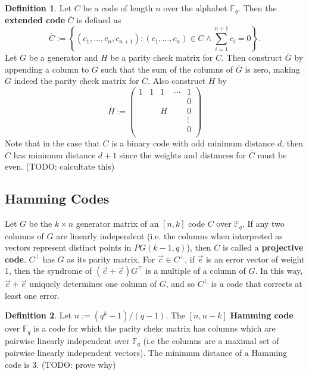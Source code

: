 \documentclass{article}
\newcommand{\F}{\mathbb{F}}
\newcommand{\dual}[1]{#1^\bot}
\newcommand{\trans}[1]{#1^\top}
\newcommand{\ext}[1]{\overline{#1}}
\renewcommand{\=}{\equiv}
\newcommand{\set}[1]{\left\{ #1 \right\}}
\renewcommand{\v}{\vec}
\theoremstyle{plain}
\theoremstyle{definition}
\newtheorem{defn}{Definition}[subsection]
\newcommand{\TODO}[1]{(TODO: #1)}
\begin{document}
\begin{defn}
Let $C$ be a code of length $n$ over the alphabet $\F_q$.
Then the \textbf{extended code} $\ext{C}$ is defined as
$$ \ext{C} := \set{ (c_1, \dots, c_n, c_{n+1}) : (c_1, \dots, c_n) \in C \land \sum_{i=1}^{n+1} c_i = 0 }. $$
Let $G$ be a generator and $H$ be a parity check matrix for $C$.
Then construct $\ext{G}$ by appending a column to $G$ such that the sum of the columns of $\ext{G}$ is zero, making $\ext{G}$ indeed the parity check matrix for $\ext{C}$.
Also construct $\ext{H}$ by
\begin{equation}
  \ext{H} := \begin{pmatrix}
    1 & 1 & 1 & \cdots & 1 \\
      &   &   &       & 0 \\
      &   & H &       & 0 \\
      &   &   &       & \vdots \\
      &   &   &       & 0 \\
  \end{pmatrix}
\end{equation}
Note that in the case that $C$ is a binary code with odd minimum distance $d$, then $\ext{C}$ has minimum distance $d + 1$ since the weights and distances for $\ext{C}$ must be even.
\TODO{calcultate this}
\end{defn}

\subsection{Hamming Codes}

Let $G$ be the $k \times n$ generator matrix of an $[n,k]$ code $C$ over $\F_q$.
If any two columns of $G$ are linearly independent (i.e. the columns when interpreted as vectors represent distinct points in $PG(k-1, q)$), then $C$ is called a \textbf{projective code}.
$\dual C$ has $G$ as its parity matrix.
For $\v c \in \dual C$, if $\v e$ is an error vector of weight 1, then the syndrome of $(\v c + \v e) \trans G$ is a multiple of a column of $G$.
In this way, $\v c + \v e$ uniquely determines one column of $G$, and so $\dual C$ is a code that corrects at least one error.

\begin{defn}
Let $n := (q^k - 1)/(q - 1)$.
The $[n, n-k]$ \textbf{Hamming code} over $\F_q$ is a code for which the parity chekc matrix has columns which are pairwise linearly independent over $\F_q$ (i.e the columns are a maximal set of pairwise linearly independent vectors).
The minimum distance of a Hamming code is 3. \TODO{prove why}
\end{defn}
\end{document}
